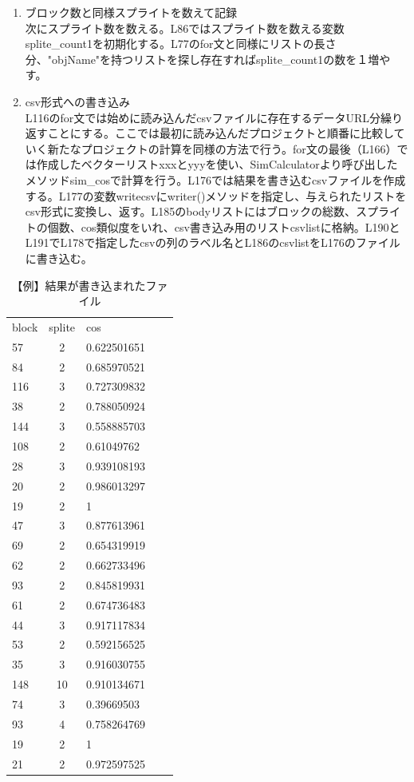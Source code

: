 \documentclass[a4paper,10pt,onecolumn,oneside,openany]{jsbook}
\begin{document}
\begin{enumerate}
\item ブロック数と同様スプライトを数えて記録
\\次にスプライト数を数える。L86ではスプライト数を数える変数splite\_count1を初期化する。L77のfor文と同様にリストの長さ分、"objName"を持つリストを探し存在すればsplite\_count1の数を１増やす。
\item csv形式への書き込み
\\L116のfor文では始めに読み込んだcsvファイルに存在するデータURL分繰り返すことにする。ここでは最初に読み込んだプロジェクトと順番に比較していく新たなプロジェクトの計算を同様の方法で行う。for文の最後（L166）では作成したベクターリストxxxとyyyを使い、SimCalculatorより呼び出したメソッドsim\_cosで計算を行う。L176では結果を書き込むcsvファイルを作成する。L177の変数writecsvにwriter()メソッドを指定し、与えられたリストをcsv形式に変換し、返す。L185のbodyリストにはブロックの総数、スプライトの個数、cos類似度をいれ、csv書き込み用のリストcsvlistに格納。L190とL191でL178で指定したcsvの列のラベル名とL186のcsvlistをL176のファイルに書き込む。
\end{enumerate}

\begin{table}[h]
 \caption{【例】結果が書き込まれたファイル}
 \label{resultex}
 \begin{center}
\begin{tabular}{lclcl}
block & splite & cos \\
57 & 2 & 0.622501651 \\
84 & 2 & 0.685970521 \\
116 & 3 & 0.727309832 \\
38 & 2 & 0.788050924 \\
144 & 3 & 0.558885703 \\
108 & 2 & 0.61049762 \\
28 & 3 & 0.939108193 \\
20 & 2 & 0.986013297 \\
19 & 2 & 1 \\
47 & 3 & 0.877613961 \\
69 & 2 & 0.654319919 \\
62 & 2 & 0.662733496 \\
93 & 2 & 0.845819931 \\
61 & 2 & 0.674736483 \\
44 & 3 & 0.917117834 \\
53 & 2 & 0.592156525 \\
35 & 3 & 0.916030755 \\
148 & 10 & 0.910134671 \\
74 & 3 & 0.39669503 \\
93 & 4 & 0.758264769 \\
19 & 2 & 1 \\
21 & 2 & 0.972597525 \\
\end{tabular}
\end{center}
\end{table}
\end{document}
